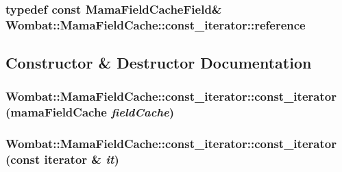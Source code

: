 \label{classWombat_1_1MamaFieldCache_1_1const__iterator_ad480d553eceafdfab681e2d9f42911bf}
\hypertarget{classWombat_1_1MamaFieldCache_1_1const__iterator_ac95fac4180be2db1073f7065248dd7e1}{
\subsubsection[{reference}]{\setlength{\rightskip}{0pt plus 5cm}typedef const {\bf MamaFieldCacheField}\& {\bf Wombat::MamaFieldCache::const\_\-iterator::reference}}}
\label{classWombat_1_1MamaFieldCache_1_1const__iterator_ac95fac4180be2db1073f7065248dd7e1}


\subsection{Constructor \& Destructor Documentation}
\hypertarget{classWombat_1_1MamaFieldCache_1_1const__iterator_a5cb4bfbb7bf267fb2d2cc7e3b7b411fe}{
\subsubsection[{const\_\-iterator}]{\setlength{\rightskip}{0pt plus 5cm}Wombat::MamaFieldCache::const\_\-iterator::const\_\-iterator (mamaFieldCache {\em fieldCache})}}
\label{classWombat_1_1MamaFieldCache_1_1const__iterator_a5cb4bfbb7bf267fb2d2cc7e3b7b411fe}
\hypertarget{classWombat_1_1MamaFieldCache_1_1const__iterator_a50ca8d2c3267279b1209797d88a79d4f}{
\subsubsection[{const\_\-iterator}]{\setlength{\rightskip}{0pt plus 5cm}Wombat::MamaFieldCache::const\_\-iterator::const\_\-iterator (const {\bf iterator} \& {\em it})}}
\label{classWombat_1_1MamaFieldCache_1_1const__iterator_a50ca8d2c3267279b1209797d88a79d4f}


